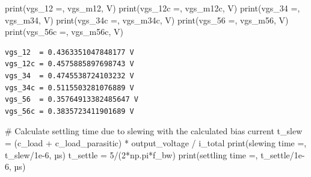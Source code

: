 \documentclass[
  a4paper,
  DIV=11,
  numbers=noendperiod]{scrartcl}
\newenvironment{Shaded}{\begin{snugshade}}{\end{snugshade}}
\newcommand{\BuiltInTok}[1]{\textcolor[rgb]{0.00,0.23,0.31}{#1}}
\newcommand{\CommentTok}[1]{\textcolor[rgb]{0.37,0.37,0.37}{#1}}
\newcommand{\DecValTok}[1]{\textcolor[rgb]{0.68,0.00,0.00}{#1}}
\newcommand{\FloatTok}[1]{\textcolor[rgb]{0.68,0.00,0.00}{#1}}
\newcommand{\NormalTok}[1]{\textcolor[rgb]{0.00,0.23,0.31}{#1}}
\newcommand{\OperatorTok}[1]{\textcolor[rgb]{0.37,0.37,0.37}{#1}}
\newcommand{\StringTok}[1]{\textcolor[rgb]{0.13,0.47,0.30}{#1}}
\begin{document}
\begin{tcolorbox}
\begin{Shaded}
\begin{Highlighting}[]
\BuiltInTok{print}\NormalTok{(}\StringTok{\textquotesingle{}vgs\_12  =\textquotesingle{}}\NormalTok{, vgs\_m12, }\StringTok{\textquotesingle{}V\textquotesingle{}}\NormalTok{)}
\BuiltInTok{print}\NormalTok{(}\StringTok{\textquotesingle{}vgs\_12c =\textquotesingle{}}\NormalTok{, vgs\_m12c, }\StringTok{\textquotesingle{}V\textquotesingle{}}\NormalTok{)}
\BuiltInTok{print}\NormalTok{(}\StringTok{\textquotesingle{}vgs\_34  =\textquotesingle{}}\NormalTok{, vgs\_m34, }\StringTok{\textquotesingle{}V\textquotesingle{}}\NormalTok{)}
\BuiltInTok{print}\NormalTok{(}\StringTok{\textquotesingle{}vgs\_34c =\textquotesingle{}}\NormalTok{, vgs\_m34c, }\StringTok{\textquotesingle{}V\textquotesingle{}}\NormalTok{)}
\BuiltInTok{print}\NormalTok{(}\StringTok{\textquotesingle{}vgs\_56  =\textquotesingle{}}\NormalTok{, vgs\_m56, }\StringTok{\textquotesingle{}V\textquotesingle{}}\NormalTok{)}
\BuiltInTok{print}\NormalTok{(}\StringTok{\textquotesingle{}vgs\_56c =\textquotesingle{}}\NormalTok{, vgs\_m56c, }\StringTok{\textquotesingle{}V\textquotesingle{}}\NormalTok{)}
\end{Highlighting}
\end{Shaded}

\begin{verbatim}
vgs_12  = 0.4363351047848177 V
vgs_12c = 0.4575885897698743 V
vgs_34  = 0.4745538724103232 V
vgs_34c = 0.5115503281076889 V
vgs_56  = 0.35764913382485647 V
vgs_56c = 0.3835723411901689 V
\end{verbatim}

\begin{Shaded}
\begin{Highlighting}[]
\CommentTok{\# Calculate settling time due to slewing with the calculated bias current}
\NormalTok{t\_slew }\OperatorTok{=}\NormalTok{ (c\_load }\OperatorTok{+}\NormalTok{ c\_load\_parasitic) }\OperatorTok{*}\NormalTok{ output\_voltage }\OperatorTok{/}\NormalTok{ i\_total}
\BuiltInTok{print}\NormalTok{(}\StringTok{\textquotesingle{}slewing time  =\textquotesingle{}}\NormalTok{, t\_slew}\OperatorTok{/}\FloatTok{1e{-}6}\NormalTok{, }\StringTok{\textquotesingle{}µs\textquotesingle{}}\NormalTok{)}
\NormalTok{t\_settle }\OperatorTok{=} \DecValTok{5}\OperatorTok{/}\NormalTok{(}\DecValTok{2}\OperatorTok{*}\NormalTok{np.pi}\OperatorTok{*}\NormalTok{f\_bw)}
\BuiltInTok{print}\NormalTok{(}\StringTok{\textquotesingle{}settling time =\textquotesingle{}}\NormalTok{, t\_settle}\OperatorTok{/}\FloatTok{1e{-}6}\NormalTok{, }\StringTok{\textquotesingle{}µs\textquotesingle{}}\NormalTok{)}
\end{Highlighting}
\end{Shaded}


\end{tcolorbox}
\end{document}
